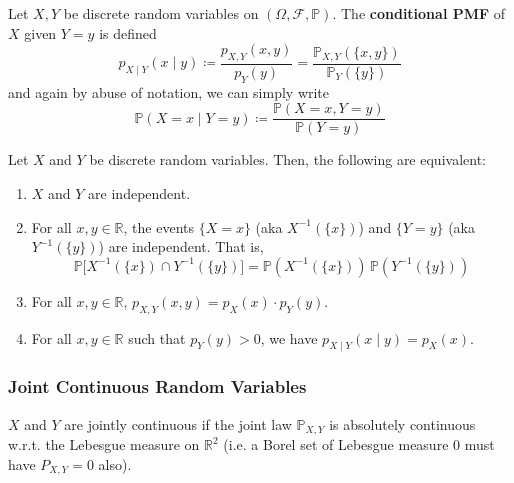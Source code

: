     \begin{definition}
      Let $X, Y$ be discrete random variables on $(\Omega, \mathcal{F}, \mathbb{P})$. The \textbf{conditional PMF} of $X$ given $Y = y$ is defined 
      \begin{equation}
        p_{X \mid Y} (x \mid y) \coloneqq \frac{p_{X, Y} (x, y)}{p_Y (y)} = \frac{\mathbb{P}_{X, Y} (\{x, y\})}{\mathbb{P}_Y (\{y\})}
      \end{equation}
      and again by abuse of notation, we can simply write 
      \begin{equation}
        \mathbb{P}(X = x \mid Y = y) \coloneqq \frac{\mathbb{P}(X = x, Y = y)}{\mathbb{P}(Y = y)}
      \end{equation}
    \end{definition}

    \begin{theorem}[TFAE]
      Let $X$ and $Y$ be discrete random variables. Then, the following are equivalent: 
      \begin{enumerate}
        \item $X$ and $Y$ are independent. 
        \item For all $x, y \in \mathbb{R}$, the events $\{X = x\}$ (aka $X^{-1} (\{x\})$) and $\{Y = y\}$ (aka $Y^{-1} (\{y\})$) are independent. That is, 
        \begin{equation}
          \mathbb{P} \big[ X^{-1}(\{x\}) \cap Y^{-1}(\{y\}) \big] = \mathbb{P}(X^{-1}(\{x\})) \, \mathbb{P}(Y^{-1}(\{y\}))
        \end{equation}
        \item For all $x, y \in \mathbb{R}$, $p_{X, Y} (x, y) = p_X (x) \cdot p_Y (y)$. 
        \item For all $x, y \in \mathbb{R}$ such that $p_Y (y) > 0$, we have $p_{X \mid Y}(x \mid y) = p_X (x)$. 
      \end{enumerate}
    \end{theorem}

  \subsubsection{Joint Continuous Random Variables}

    \begin{definition}
      $X$ and $Y$ are jointly continuous if the joint law $\mathbb{P}_{X, Y}$ is absolutely continuous w.r.t. the Lebesgue measure on $\mathbb{R}^2$ (i.e. a Borel set of Lebesgue measure $0$ must have $P_{X, Y} = 0$ also). 
    \end{definition}

